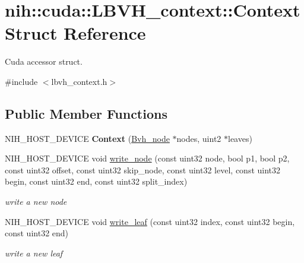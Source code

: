 \hypertarget{structnih_1_1cuda_1_1_l_b_v_h__context_1_1_context}{
\section{nih\-:\-:cuda\-:\-:\-L\-B\-V\-H\-\_\-context\-:\-:\-Context \-Struct \-Reference}
\label{structnih_1_1cuda_1_1_l_b_v_h__context_1_1_context}
}


\-Cuda accessor struct.  




{\ttfamily \#include $<$lbvh\-\_\-context.\-h$>$}

\subsection*{\-Public \-Member \-Functions}
\begin{DoxyCompactItemize}
\item 
\hypertarget{structnih_1_1cuda_1_1_l_b_v_h__context_1_1_context_a48c48237aa069100299b8b8f6d3e351e}{
\-N\-I\-H\-\_\-\-H\-O\-S\-T\-\_\-\-D\-E\-V\-I\-C\-E {\bfseries \-Context} (\hyperlink{structnih_1_1_bvh__node}{\-Bvh\-\_\-node} $\ast$nodes, uint2 $\ast$leaves)}
\label{structnih_1_1cuda_1_1_l_b_v_h__context_1_1_context_a48c48237aa069100299b8b8f6d3e351e}

\item 
\hypertarget{structnih_1_1cuda_1_1_l_b_v_h__context_1_1_context_a01bc38979207524a3965460096336a9a}{
\-N\-I\-H\-\_\-\-H\-O\-S\-T\-\_\-\-D\-E\-V\-I\-C\-E void \hyperlink{structnih_1_1cuda_1_1_l_b_v_h__context_1_1_context_a01bc38979207524a3965460096336a9a}{write\-\_\-node} (const uint32 node, bool p1, bool p2, const uint32 offset, const uint32 skip\-\_\-node, const uint32 level, const uint32 begin, const uint32 end, const uint32 split\-\_\-index)}
\label{structnih_1_1cuda_1_1_l_b_v_h__context_1_1_context_a01bc38979207524a3965460096336a9a}

\begin{DoxyCompactList}\small\item\em write a new node \end{DoxyCompactList}\item 
\hypertarget{structnih_1_1cuda_1_1_l_b_v_h__context_1_1_context_a1a3568a9281f2af0787dfbb641f9b68e}{
\-N\-I\-H\-\_\-\-H\-O\-S\-T\-\_\-\-D\-E\-V\-I\-C\-E void \hyperlink{structnih_1_1cuda_1_1_l_b_v_h__context_1_1_context_a1a3568a9281f2af0787dfbb641f9b68e}{write\-\_\-leaf} (const uint32 index, const uint32 begin, const uint32 end)}
\label{structnih_1_1cuda_1_1_l_b_v_h__context_1_1_context_a1a3568a9281f2af0787dfbb641f9b68e}

\begin{DoxyCompactList}\small\item\em write a new leaf \end{DoxyCompactList}\end{DoxyCompactItemize}
